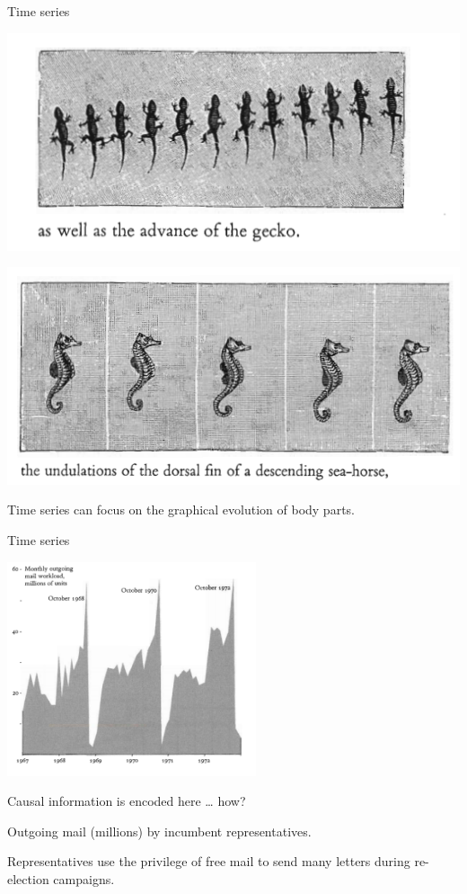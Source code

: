 \documentclass[
  ignorenonframetext,
]{beamer}
\begin{document}
\begin{frame}{Time series}
\protect\hypertarget{time-series-5}{}
\centering
\begin{minipage}{0.55\textwidth}
\centering
\includegraphics[width=\textwidth]{excellence_figs/fig_19.png}
\end{minipage}
\hfill
\begin{minipage}{0.55\textwidth}
\centering
\includegraphics[width=\textwidth]{excellence_figs/fig_18.png}
\end{minipage}

Time series can focus on the graphical evolution of body parts.
\end{frame}

\begin{frame}{Time series}
\protect\hypertarget{time-series-6}{}
\begin{center}
\includegraphics[width=0.55\textwidth]{excellence_figs/fig_20.png}
\end{center}

\footnotesize

Causal information is encoded here \ldots{} how?

Outgoing mail (millions) by incumbent representatives.

Representatives use the privilege of free mail to send many letters
during re-election campaigns.
\end{frame}
\end{document}
